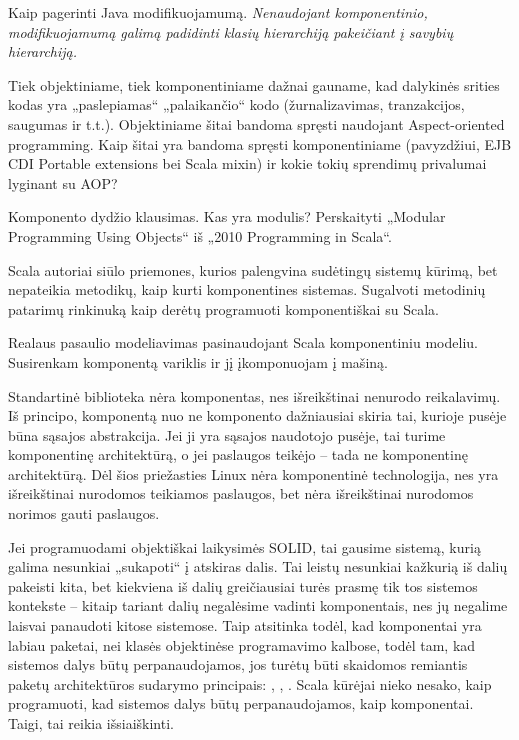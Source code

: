 Kaip pagerinti Java modifikuojamumą. \emph{Nenaudojant komponentinio,
modifikuojamumą galimą padidinti klasių hierarchiją pakeičiant
į savybių hierarchiją.}

Tiek objektiniame, tiek komponentiniame dažnai gauname, kad dalykinės
srities kodas yra „paslepiamas“ „palaikančio“ kodo (žurnalizavimas,
tranzakcijos, saugumas ir t.t.). Objektiniame šitai bandoma spręsti
naudojant Aspect-oriented programming. Kaip šitai yra bandoma
spręsti komponentiniame (pavyzdžiui, EJB CDI Portable extensions
bei Scala mixin) ir kokie tokių sprendimų privalumai lyginant su AOP?

Komponento dydžio klausimas. Kas yra modulis? Perskaityti „Modular
Programming Using Objects“ iš „2010 Programming in Scala“.

Scala autoriai siūlo priemones, kurios palengvina sudėtingų sistemų
kūrimą, bet nepateikia metodikų, kaip kurti komponentines sistemas.
Sugalvoti metodinių patarimų rinkinuką kaip derėtų programuoti
komponentiškai su Scala.

Realaus pasaulio modeliavimas pasinaudojant Scala komponentiniu
modeliu. Susirenkam komponentą variklis ir jį įkomponuojam į
mašiną.

Standartinė biblioteka nėra komponentas, nes išreikštinai nenurodo
reikalavimų. Iš principo, komponentą nuo ne komponento dažniausiai
skiria tai, kurioje pusėje būna sąsajos abstrakcija. Jei ji yra
sąsajos naudotojo pusėje, tai turime komponentinę architektūrą, o
jei paslaugos teikėjo – tada ne komponentinę architektūrą. Dėl šios
priežasties Linux nėra komponentinė technologija, nes yra
išreikštinai nurodomos teikiamos paslaugos, bet nėra išreikštinai
nurodomos norimos gauti paslaugos.

Jei programuodami objektiškai laikysimės SOLID, tai gausime sistemą,
kurią galima nesunkiai „sukapoti“ į atskiras dalis. Tai leistų
nesunkiai kažkurią iš dalių pakeisti kita, bet kiekviena iš dalių
greičiausiai turės prasmę tik tos sistemos kontekste – kitaip
tariant dalių negalėsime vadinti komponentais, nes jų negalime
laisvai panaudoti kitose sistemose. Taip atsitinka todėl, kad
komponentai yra labiau paketai, nei klasės objektinėse programavimo
kalbose, todėl tam, kad sistemos dalys būtų perpanaudojamos, jos
turėtų būti skaidomos remiantis paketų architektūros sudarymo
principais: ,
, 
\cite[17]{design-principles-and-design-patterns}.
Scala kūrėjai nieko nesako, kaip programuoti, kad sistemos
dalys būtų perpanaudojamos, kaip komponentai. Taigi, tai reikia
išsiaiškinti.

